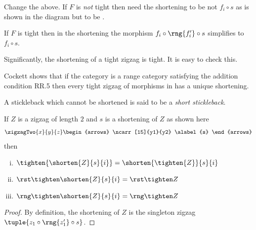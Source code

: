 {\newcommand{\rngTightener}[2]
    {
          \rng{
                \rst{#1_{#2+1}} \circ #1'_{#2}
               }            
    }

\newcommand{\rngTightenerOne}[1]
    {
          \rng{
                \rst{#1_{2}} \circ #1'_{1}
               }            
    }

\newcommand{ \rstTightener}[2]
    {
          \rst{
                #1'_{#2} \circ \rng{#1_{#2}}  
               }
    } 
\begin{notebox}
Change the above. If $F$ is \emph{not} tight
then need the shortening to be not $f_i \circ s$ as is shown in the diagram but to be \oldt{$f_i \circ \rngTightener{f}{i} \circ s$}  
.
\end{notebox}

\begin{observation}
If $F$ is tight then in the shortening the
morphism $f_i \circ \rng{f'_i} \circ s$ simplifies to $f_i \circ s$.
\end{observation}
Significantly, the shortening of a tight zigzag is  tight.
It is easy to check this.


Cockett shows that if the category \catcw is a range category
satisfying the addition condition RR.5 then every tight
zigzag of morphisms in \catcw has a unique shortening. 

A stickleback which cannot be shortened is said to be
a \textit{short stickleback}.

\begin{lemma}
\end{lemma}
If $Z$ is a zigzag of length $2$ and $s$ is a shortening of $Z$
as shown here
\[
\zigzagTwo{x}{y}{z}
\begin{arrows}
\ncarr[15]{y1}{y2} \alabel{s}
\end{arrows}
\]
then
\begin{enumerate}[(i)]
\item 
$\tighten{\shorten{Z}{s}{i}} =\shorten{\tighten{Z}}{s}{i}
$
\item 
$\abrst{\shorten{Z}{s}{i}} = \abrst{Z}$ 
\item
$\abrng{\shorten{Z}{s}{i}} = \abrng{Z}$ 
\end{enumerate}
\begin{proof}
By definition, the shortening of $Z$
is the singleton zigzag
$\tuple{z_1 \circ \rng{z'_1} \circ s}$.


\end{proof}}

